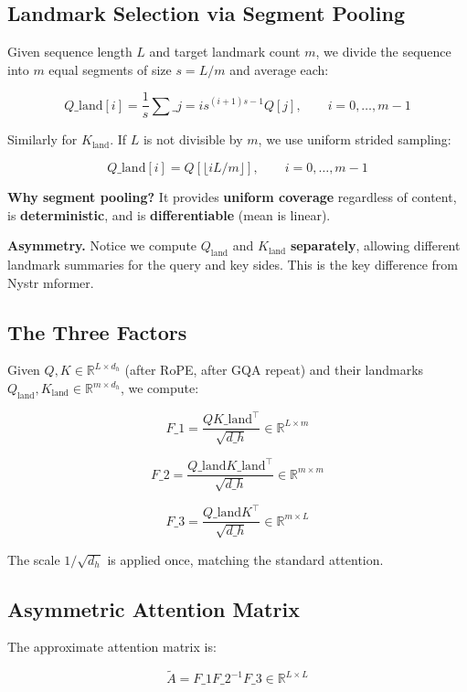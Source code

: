 \subsection{Landmark Selection via Segment Pooling}

Given sequence length $L$ and target landmark count $m$, we divide the 
sequence into $m$ equal segments of size $s = L / m$ and average each:

\[
Q\_\text{land}[i] = \frac{1}{s} \sum\_{j = i s}^{(i+1) s - 1} Q[j], \qquad i = 0, \ldots, m - 1
\]

Similarly for $K_\text{land}$. If $L$ is not divisible by $m$, we use 
uniform strided sampling:

\[
Q\_\text{land}[i] = Q[\lfloor i L / m \rfloor], \qquad i = 0, \ldots, m - 1
\]

\textbf{Why segment pooling?} It provides \textbf{uniform coverage} regardless of 
content, is \textbf{deterministic}, and is \textbf{differentiable} (mean is linear).

\textbf{Asymmetry.} Notice we compute $Q_\text{land}$ and $K_\text{land}$ 
\textbf{separately}, allowing different landmark summaries for the query and 
key sides. This is the key difference from Nystr mformer.

\subsection{The Three Factors}

Given $Q, K \in \mathbb{R}^{L \times d_h}$ (after RoPE, after GQA repeat) and 
their landmarks $Q_\text{land}, K_\text{land} \in \mathbb{R}^{m \times d_h}$, 
we compute:

\[
F\_1 = \frac{Q K\_\text{land}^\top}{\sqrt{d\_h}} \in \mathbb{R}^{L \times m}
\]

\[
F\_2 = \frac{Q\_\text{land} K\_\text{land}^\top}{\sqrt{d\_h}} \in \mathbb{R}^{m \times m}
\]

\[
F\_3 = \frac{Q\_\text{land} K^\top}{\sqrt{d\_h}} \in \mathbb{R}^{m \times L}
\]

The scale $1/\sqrt{d_h}$ is applied once, matching the standard attention.

\subsection{Asymmetric Attention Matrix}

The approximate attention matrix is:

\[
\tilde{A} = F\_1 F\_2^{-1} F\_3 \in \mathbb{R}^{L \times L}
\]

